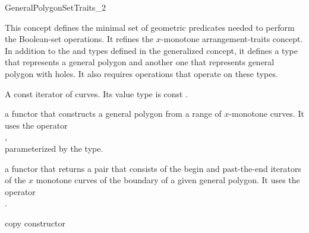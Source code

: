 \ccRefPageBegin

\begin{ccRefConcept}{GeneralPolygonSetTraits_2}

\ccThreeToTwo

\ccDefinition
This concept defines the minimal set of geometric predicates needed to
perform the Boolean-set operations. It refines the $x$-monotone
arrangement-traits concept. In addition to the  and
 types defined in the generalized concept, it defines
a type that represents a general polygon and another one that represents
general polygon with holes. It also requires operations that operate on these
types.

\ccRefines
{}

\ccTypes

\ccGlue
{}

{A const iterator of curves. Its value type is const
.}


\ccThreeToTwo

{a functor that constructs a general polygon from a range of
$x$-monotone curves. It uses the operator\\
 , \\
 parameterized by the  type.}

{a functor that returns a pair that consists of the begin and
 past-the-end iterators of the $x$ monotone curves of the boundary of
 a given general polygon. It uses the operator\\
 .}

\ccCreation
{}

\ccGlue
{}
{copy constructor}
\ccGlue
{}



\end{ccRefConcept}
